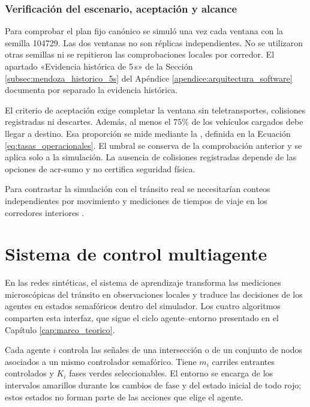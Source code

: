 \subsubsection{Verificación del escenario, aceptación y alcance}
\label{subsubsec:mendoza_validacion_operacional}

Para comprobar el plan fijo canónico se simuló una vez cada ventana con la semilla 104729. Las dos ventanas no son réplicas independientes. No se utilizaron otras semillas ni se repitieron las comprobaciones locales por corredor. El apartado «Evidencia histórica de 5\,s» de la Sección \ref{subsec:mendoza_historico_5s} del Apéndice \ref{apendice:arquitectura_software} documenta por separado la evidencia histórica.

El criterio de aceptación exige completar la ventana sin teletransportes, colisiones registradas ni descartes. Además, al menos el $75\%$ de los vehículos cargados debe llegar a destino. Esa proporción se mide mediante la , definida en la Ecuación \eqref{eq:tasas_operacionales}. El umbral se conserva de la comprobación anterior y se aplica solo a la simulación. La ausencia de colisiones registradas depende de las opciones de \acrshort{acr-sumo} y no certifica seguridad física.

Para contrastar la simulación con el tránsito real se necesitarían conteos independientes por movimiento y mediciones de tiempos de viaje en los corredores interiores \cite{Sargent2013,Wunderlich2019Microsimulation}.

\section{Sistema de control multiagente}
\label{sec:arquitectura_entorno_agentes}

En las redes sintéticas, el sistema de aprendizaje transforma las mediciones microscópicas del tránsito en observaciones locales y traduce las decisiones de los agentes en estados semafóricos dentro del simulador. Los cuatro algoritmos comparten esta interfaz, que sigue el ciclo agente--entorno presentado en el Capítulo \ref{cap:marco_teorico}.

Cada agente $i$ controla las señales de una intersección o de un conjunto de nodos asociados a un mismo controlador semafórico. Tiene $m_i$ carriles entrantes controlados y $K_i$ fases verdes seleccionables. El entorno se encarga de los intervalos amarillos durante los cambios de fase y del estado inicial de todo rojo; estos estados no forman parte de las acciones que elige el agente.

